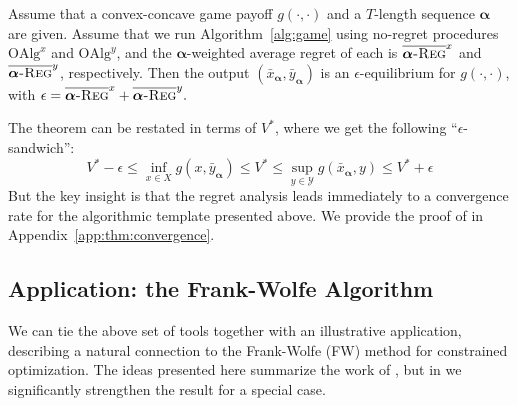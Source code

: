 \documentclass[pmlr]{jmlr} %
\def\balpha{\boldsymbol{\alpha}}
\def\alg{\text{OAlg}}
\newcommand{\avgregret}[1]{\overline{\balpha\textsc{-Reg}}^{#1}}
\newcommand{\YY}{\mathcal{Y}}
\newcommand{\pr}[1]{\left(#1\right)}
\begin{document}








\begin{theorem} \label{thm:convergence}
	Assume that a convex-concave game payoff $g(\cdot, \cdot)$ and a $T$-length sequence $\balpha$ are given. Assume that we run Algorithm~\ref{alg:game} using no-regret procedures $\alg^{x}$ and $\alg^{y}$, and the $\balpha$-weighted average regret of each is $\avgregret{x}$ and $\avgregret{y}$, respectively. Then the output  $(\bar{x}_{\balpha},\bar{y}_{\balpha})$ is an $\epsilon$-equilibrium for $g(\cdot, \cdot)$, with $\epsilon = \avgregret{x} + \avgregret{y}.$
\end{theorem}
The theorem can be restated in terms of $V^{*}$, where we get the following ``$\epsilon$-sandwich'':
\begin{equation} \label{eq:xyguarantee}
\textstyle   V^{*} - \epsilon
   \leq \inf_{x\in X} g \pr{x, \bar{y}_{\balpha}} 
   \leq V^{*} 
   \leq \sup_{y\in \YY} g\pr{ \bar{x}_{\balpha}, y}  
   \leq  V^{*} + \epsilon
\end{equation}
But the key insight is that the regret analysis leads immediately to a convergence rate for the algorithmic template presented above. We provide the proof of  in Appendix~\ref{app:thm:convergence}.
\subsection{Application: the Frank-Wolfe Algorithm}
We can tie the above set of tools together with an illustrative application, describing a natural connection to the Frank-Wolfe (FW) method \citep{frank1956algorithm} for constrained optimization. The ideas presented here summarize the work of \citet{AW17},  but in  we significantly strengthen the result for a special case.
\end{document}
